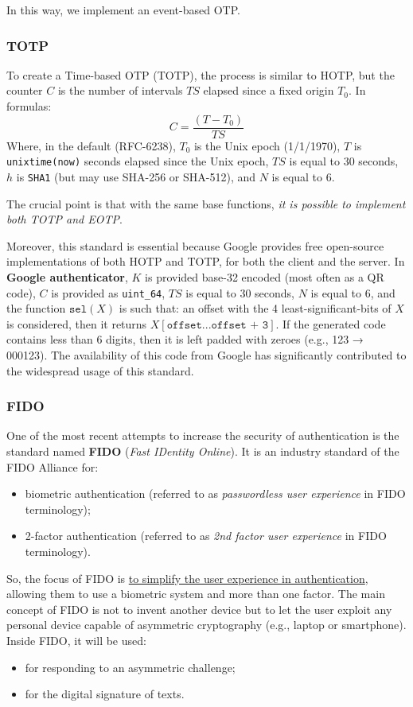 In this way, we implement an event-based OTP.


\subsubsection{TOTP}
To create a Time-based OTP (TOTP), the process is similar to HOTP, but the counter \(C\) is the number of intervals \(TS\) elapsed since a fixed origin \(T_0\). In formulas:
\[ C = \frac{(T - T_0)}{TS} \]
Where, in the default (RFC-6238), \(T_0\) is the Unix epoch (1/1/1970), \(T\) is \texttt{unixtime(now)} seconds elapsed since the Unix epoch, \(TS\) is equal to 30 seconds, \(h\) is \texttt{SHA1} (but may use SHA-256 or SHA-512), and \(N\) is equal to 6.

The crucial point is that with the same base functions, \textit{it is possible to implement both TOTP and EOTP}.

Moreover, this standard is essential because Google provides free open-source implementations of both HOTP and TOTP, for both the client and the server. In \textbf{Google authenticator}, \(K\) is provided base-32 encoded (most often as a QR code), \(C\) is provided as \texttt{uint\_64}, \(TS\) is equal to 30 seconds, \(N\) is equal to 6, and the function \(\texttt{sel}(X)\) is such that: an offset with the 4 least-significant-bits of \(X\) is considered, then it returns \(X[\texttt{offset}...\texttt{offset + 3}]\). If the generated code contains less than 6 digits, then it is left padded with zeroes (e.g., 123 → 000123).
The availability of this code from Google has significantly contributed to the widespread usage of this standard.


\subsubsection{FIDO}\label{chap:fido}
One of the most recent attempts to increase the security of authentication is the standard named \textbf{FIDO} (\textit{Fast IDentity Online}). It is an industry standard of the FIDO Alliance for:
\begin{itemize}
	\item biometric authentication (referred to as \textit{passwordless user experience} in FIDO terminology);
	\item 2-factor authentication (referred to as \textit{2nd factor user experience} in FIDO terminology).
\end{itemize}

So, the focus of FIDO is \ul{to simplify the user experience in authentication}, allowing them to use a biometric system and more than one factor. The main concept of FIDO is not to invent another device but to let the user exploit any personal device capable of asymmetric cryptography (e.g., laptop or smartphone). Inside FIDO, it will be used:
\begin{itemize}
	\item for responding to an asymmetric challenge;
	\item for the digital signature of texts.
\end{itemize}

